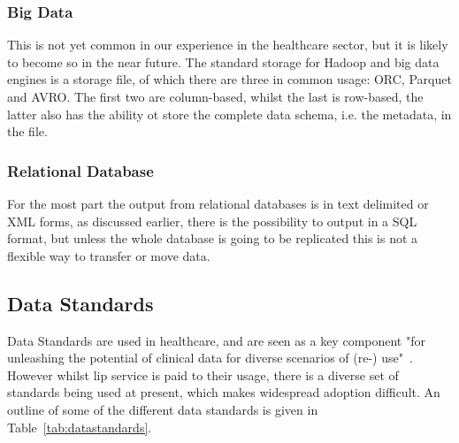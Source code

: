 \documentclass[runningheads]{llncs}
\begin{document}
	\subsubsection{Big Data}
	This is not yet common in our experience in the healthcare sector, but it is likely to become so in the near future. The standard storage for Hadoop and big data engines is a storage file, of which there are three in common usage: ORC, Parquet and AVRO. The first two are column-based, whilst the last is row-based, the latter also has the ability ot store the complete data schema, i.e. the metadata, in the file.
	\subsubsection{Relational Database}
	For the most part the output from relational databases is in text delimited or XML forms, as discussed earlier, there is the possibility to output in a SQL format, but unless the whole database is going to be replicated this is not a flexible way to transfer or move data.
	\subsection{Data Standards}
	Data Standards are used in healthcare, and are seen as a key component "for unleashing the potential of clinical data for
   diverse scenarios of (re-) use"~\cite{Schulz2019}. However whilst lip service is paid to their usage, there is a diverse set of standards being used at present, which makes widespread adoption difficult. An outline of some of the different data standards is given in Table~\ref{tab:datastandards}.
   
\end{document}
